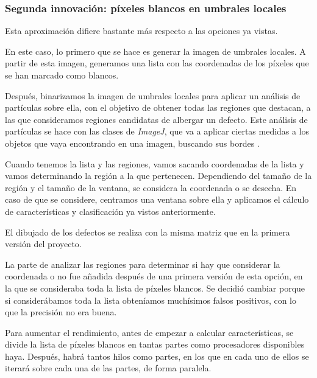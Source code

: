 \subsubsection{Segunda innovación: píxeles blancos en umbrales locales}
Esta aproximación difiere bastante más respecto a las opciones ya vistas.

En este caso, lo primero que se hace es generar la imagen de umbrales locales. A partir de esta imagen, generamos una lista con las coordenadas de los píxeles que se han marcado como blancos.

Después, binarizamos la imagen de umbrales locales para aplicar un análisis de partículas sobre ella, con el objetivo de obtener todas las regiones que destacan, a las que consideramos regiones candidatas de albergar un defecto. Este análisis de partículas se hace con las clases de \emph{ImageJ}, que va a aplicar ciertas medidas a los objetos que vaya encontrando en una imagen, buscando sus bordes \cite{particleij}.

Cuando tenemos la lista y las regiones, vamos sacando coordenadas de la lista y vamos determinando la región a la que pertenecen. Dependiendo del tamaño de la región y el tamaño de la ventana, se considera la coordenada o se desecha. En caso de que se considere, centramos una ventana sobre ella y aplicamos el cálculo de características y clasificación ya vistos anteriormente.


El dibujado de los defectos se realiza con la misma matriz que en la primera versión del proyecto.

La parte de analizar las regiones para determinar si hay que considerar la coordenada o no fue añadida después de una primera versión de esta opción, en la que se consideraba toda la lista de píxeles blancos. Se decidió cambiar porque si considerábamos toda la lista obteníamos muchísimos falsos positivos, con lo que la precisión no era buena.

Para aumentar el rendimiento, antes de empezar a calcular características, se divide la lista de píxeles blancos en tantas partes como procesadores disponibles haya. Después, habrá tantos hilos como partes, en los que en cada uno de ellos se iterará sobre cada una de las partes, de forma paralela.

